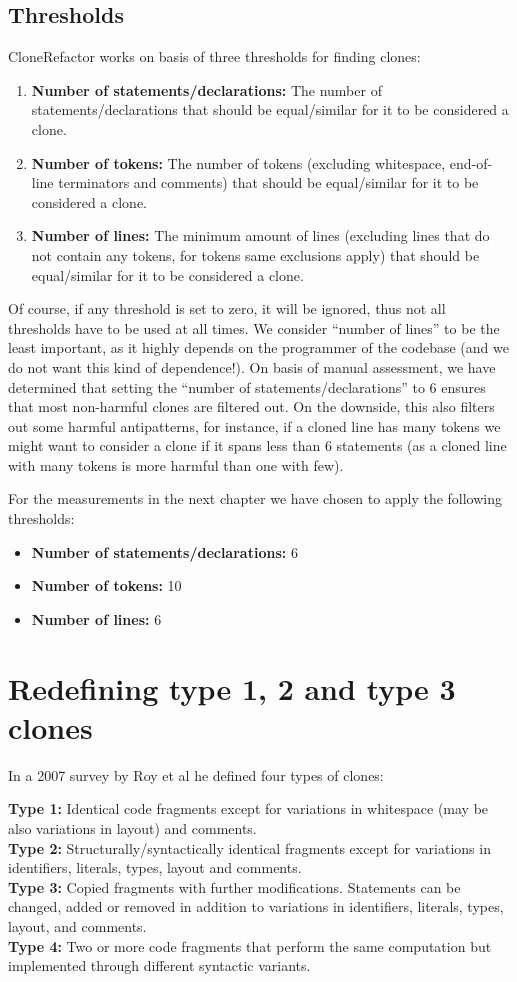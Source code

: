 \documentclass[a4paper]{article}
\begin{document}
\subsection{Thresholds}
CloneRefactor works on basis of three thresholds for finding clones:
\begin{enumerate}
  \item \textbf{Number of statements/declarations:} The number of statements/declarations that should be equal/similar for it to be considered a clone.
  \item \textbf{Number of tokens:} The number of tokens (excluding whitespace, end-of-line terminators and comments) that should be equal/similar for it to be considered a clone.
  \item \textbf{Number of lines:} The minimum amount of lines (excluding lines that do not contain any tokens, for tokens same exclusions apply) that should be equal/similar for it to be considered a clone.
\end{enumerate}
Of course, if any threshold is set to zero, it will be ignored, thus not all thresholds have to be used at all times. We consider ``number of lines'' to be the least important, as it highly depends on the programmer of the codebase (and we do not want this kind of dependence!). On basis of manual assessment, we have determined that setting the ``number of statements/declarations'' to 6 ensures that most non-harmful clones are filtered out. On the downside, this also filters out some harmful antipatterns, for instance, if a cloned line has many tokens we might want to consider a clone if it spans less than 6 statements (as a cloned line with many tokens is more harmful than one with few).

For the measurements in the next chapter we have chosen to apply the following thresholds:
\begin{itemize}
  \item \textbf{Number of statements/declarations:} 6
  \item \textbf{Number of tokens:} 10
  \item \textbf{Number of lines:} 6
\end{itemize}

\section{Redefining type 1, 2 and type 3 clones}
In a 2007 survey by Roy et al \cite{roy2007survey} he defined four types of clones:

\textbf{Type 1:} Identical code fragments except for variations in whitespace (may be also variations in layout) and comments.\\
\textbf{Type 2:} Structurally/syntactically identical fragments except for variations in identifiers, literals, types, layout and comments.\\
\textbf{Type 3:} Copied fragments with further modifications. Statements can be changed, added or removed in addition to variations in identifiers, literals, types, layout, and comments.\\
\textbf{Type 4:} Two or more code fragments that perform the same computation but implemented through different syntactic variants.
\end{document}
